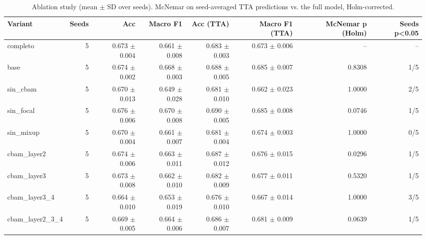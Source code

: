 \begin{table}[ht]
\centering
\small
\caption{Ablation study (mean $\pm$ SD over seeds). McNemar on seed-averaged TTA predictions vs. the full model, Holm-corrected.}
\label{tab:ablation}
\begin{tabular}{lrrrrrrr}
\toprule
Variant & Seeds & Acc & Macro F1 & Acc (TTA) & Macro F1 (TTA) & McNemar p (Holm) & Seeds p<0.05 \\
\midrule
completo & 5 & 0.673 $\pm$ 0.004 & 0.661 $\pm$ 0.008 & 0.683 $\pm$ 0.003 & 0.673 $\pm$ 0.006 & -- & -- \\
base & 5 & 0.674 $\pm$ 0.002 & 0.668 $\pm$ 0.003 & 0.688 $\pm$ 0.005 & 0.685 $\pm$ 0.007 & 0.8308 & 1/5 \\
sin\_cbam & 5 & 0.670 $\pm$ 0.013 & 0.649 $\pm$ 0.028 & 0.681 $\pm$ 0.010 & 0.662 $\pm$ 0.023 & 1.0000 & 2/5 \\
sin\_focal & 5 & 0.676 $\pm$ 0.006 & 0.670 $\pm$ 0.008 & 0.690 $\pm$ 0.005 & 0.685 $\pm$ 0.008 & 0.0746 & 1/5 \\
sin\_mixup & 5 & 0.670 $\pm$ 0.004 & 0.661 $\pm$ 0.007 & 0.681 $\pm$ 0.004 & 0.674 $\pm$ 0.003 & 1.0000 & 0/5 \\
cbam\_layer2 & 5 & 0.674 $\pm$ 0.006 & 0.663 $\pm$ 0.011 & 0.687 $\pm$ 0.012 & 0.676 $\pm$ 0.015 & 0.0296 & 1/5 \\
cbam\_layer3 & 5 & 0.673 $\pm$ 0.008 & 0.662 $\pm$ 0.010 & 0.682 $\pm$ 0.009 & 0.677 $\pm$ 0.011 & 0.5320 & 1/5 \\
cbam\_layer3\_4 & 5 & 0.664 $\pm$ 0.010 & 0.653 $\pm$ 0.019 & 0.676 $\pm$ 0.010 & 0.667 $\pm$ 0.014 & 1.0000 & 3/5 \\
cbam\_layer2\_3\_4 & 5 & 0.669 $\pm$ 0.005 & 0.664 $\pm$ 0.006 & 0.686 $\pm$ 0.007 & 0.681 $\pm$ 0.009 & 0.0639 & 1/5 \\
\bottomrule
\end{tabular}
\end{table}